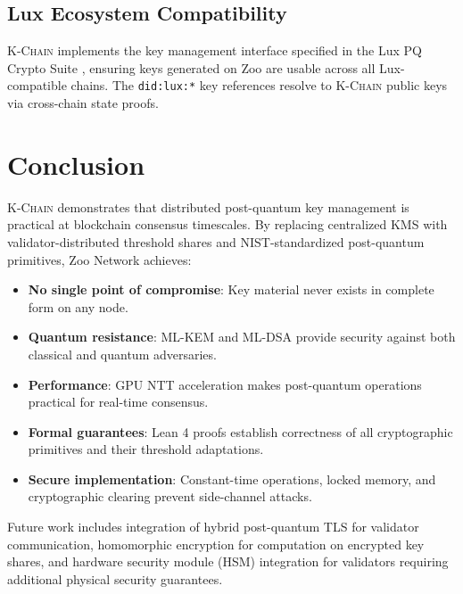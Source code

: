 \documentclass[11pt,letterpaper]{article}
\theoremstyle{definition}
\theoremstyle{remark}
\newcommand{\KChain}{\textsc{K-Chain}}
\begin{document}
\subsection{Lux Ecosystem Compatibility}

\KChain{} implements the key management interface specified in the Lux PQ Crypto Suite \cite{lux-pq-crypto-suite}, ensuring keys generated on Zoo are usable across all Lux-compatible chains. The \texttt{did:lux:*} key references resolve to \KChain{} public keys via cross-chain state proofs.

\section{Conclusion}

\KChain{} demonstrates that distributed post-quantum key management is practical at blockchain consensus timescales. By replacing centralized KMS with validator-distributed threshold shares and NIST-standardized post-quantum primitives, Zoo Network achieves:

\begin{itemize}
\item \textbf{No single point of compromise}: Key material never exists in complete form on any node.
\item \textbf{Quantum resistance}: ML-KEM and ML-DSA provide security against both classical and quantum adversaries.
\item \textbf{Performance}: GPU NTT acceleration makes post-quantum operations practical for real-time consensus.
\item \textbf{Formal guarantees}: Lean 4 proofs establish correctness of all cryptographic primitives and their threshold adaptations.
\item \textbf{Secure implementation}: Constant-time operations, locked memory, and cryptographic clearing prevent side-channel attacks.
\end{itemize}

Future work includes integration of hybrid post-quantum TLS for validator communication, homomorphic encryption for computation on encrypted key shares, and hardware security module (HSM) integration for validators requiring additional physical security guarantees.
\end{document}
